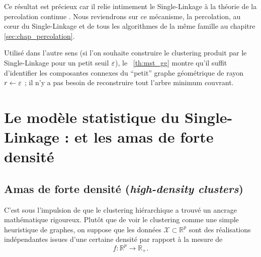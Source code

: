         
        

Ce résultat est précieux car il relie intimement le Single-Linkage à la théorie de la percolation continue \cite{MeesterRoy, penrose2003, BibiIstambul}. Nous reviendrons sur ce mécanisme, la percolation, au cœur du Single-Linkage et de tous les algorithmes de la même famille au chapitre \ref{sec:chap_percolation}.


Utilisé dans l'autre sens (si l'on souhaite construire le clustering produit par le Single-Linkage pour un petit seuil $\varepsilon$), le \Th~\ref{th:mst_gg} montre qu'il suffit d'identifier les composantes connexes du ``petit'' graphe géométrique de rayon $r \gets \varepsilon$ ; il n'y a pas besoin de reconstruire tout l'arbre minimum couvrant.

\section{Le modèle statistique du Single-Linkage :  et les amas de forte densité}


\subsection{Amas de forte densité (\emph{high-density clusters})}

C'est sous l'impulsion de  \cite{hartigan75} que le clustering hiérarchique a trouvé un ancrage mathématique rigoureux. Plutôt que de voir le clustering comme une simple heuristique de graphes, on suppose que les données $\mathcal X \subset \mathbb R^p$ sont des réalisations indépendantes issues d'une certaine densité par rapport à la mesure de  
\[
f : \mathbb R^p \to \mathbb R_+ .
\]

